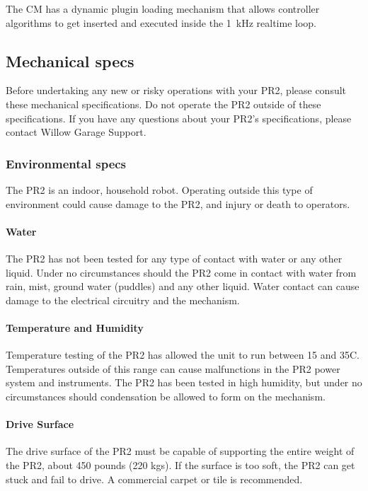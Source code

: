 The CM has a dynamic plugin loading mechanism that allows controller
algorithms to get inserted and executed inside the 1~kHz realtime
loop.


\subsection{Mechanical specs}

Before undertaking any new or risky operations with your PR2, please consult these mechanical specifications. Do not operate the PR2 outside of these specifications. If you have any questions about your PR2's specifications, please contact Willow Garage Support.

\subsubsection{Environmental specs}

The PR2 is an indoor, household robot. Operating outside this type of environment could cause damage to the PR2, and  injury or death to operators.

\paragraph{Water}

The PR2 has not been tested for any type of contact with water or any other liquid. Under no circumstances should the PR2 come in contact with water from rain, mist, ground water (puddles) and any other liquid. Water contact can cause damage to the electrical circuitry and the mechanism.

\paragraph{Temperature and Humidity}

Temperature testing of the PR2 has allowed the unit to run between 15 and 35C. Temperatures outside of this range can cause malfunctions in the PR2 power system and instruments. The PR2 has been tested in high humidity, but under no circumstances should condensation be allowed to form on the mechanism.

\paragraph{Drive Surface}

The drive surface of the PR2 must be capable of supporting the entire weight of the PR2, about 450 pounds (220 kgs). If the surface is too soft, the PR2 can get stuck and fail to drive. A commercial carpet or tile is recommended. 

